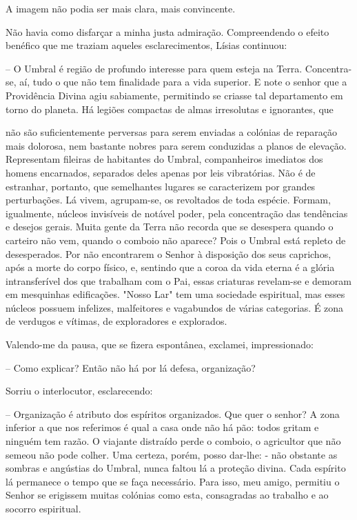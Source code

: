 \documentclass[portuguese,12pt,a4paper]{scrbook}
\begin{document}
	A imagem não podia ser mais clara, mais convincente.
	
	Não havia como disfarçar a minha justa admiração. Compreendendo o efeito benéfico que me traziam aqueles esclarecimentos, Lísias continuou:
	
	– O Umbral é região de profundo interesse para quem esteja na Terra. Concentra-se, aí, tudo o que não tem finalidade para a vida superior. E note o senhor que a Providência Divina agiu sabiamente, permitindo se criasse tal departamento em torno do planeta. Há legiões compactas de almas irresolutas e ignorantes, que
	
	
	não são suficientemente perversas para serem enviadas a colónias de reparação mais dolorosa, nem bastante nobres para serem conduzidas a planos de elevação. Representam fileiras de habitantes do Umbral, companheiros imediatos dos homens encarnados, separados deles apenas por leis vibratórias. Não é de estranhar, portanto, que semelhantes lugares se caracterizem por grandes perturbações. Lá vivem, agrupam-se, os revoltados de toda espécie. Formam, igualmente, núcleos invisíveis de notável poder, pela concentração das tendências e desejos gerais. Muita gente da Terra não recorda que se desespera quando o carteiro não vem, quando o comboio não aparece? Pois o Umbral está repleto de desesperados. Por não encontrarem o Senhor à disposição dos seus caprichos, após a morte do corpo físico, e, sentindo que a coroa da vida eterna é a glória intransferível dos que trabalham com o Pai, essas criaturas revelam-se e demoram em mesquinhas edificações. "Nosso Lar" tem uma sociedade espiritual, mas esses núcleos possuem infelizes, malfeitores e vagabundos de várias categorias. É zona de verdugos e vítimas, de exploradores e explorados.
	
	Valendo-me da pausa, que se fizera espontânea, exclamei, impressionado:
	
	– Como explicar? Então não há por lá defesa, organização?
	
	Sorriu o interlocutor, esclarecendo:
	
	– Organização é atributo dos espíritos organizados. Que quer o senhor? A zona inferior a que nos referimos é qual a casa onde não há pão: todos gritam e ninguém tem razão. O viajante distraído perde o comboio, o agricultor que não semeou não pode colher. Uma certeza, porém, posso dar-lhe: - não obstante as sombras e angústias do Umbral, nunca faltou lá a proteção divina. Cada espírito lá permanece o tempo que se faça necessário. Para isso, meu amigo, permitiu o Senhor se erigissem muitas colónias como esta, consagradas ao trabalho e ao socorro espiritual.
	
\end{document}
